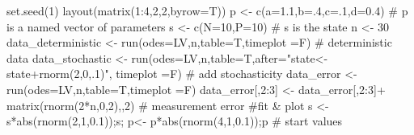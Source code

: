 \documentclass[
  a4paper,
  DIV=11,
  numbers=noendperiod,
  oneside]{scrreprt}
\newenvironment{Shaded}{}{}
\newcommand{\AttributeTok}[1]{\textcolor[rgb]{0.84,0.23,0.29}{#1}}
\newcommand{\CommentTok}[1]{\textcolor[rgb]{0.42,0.45,0.49}{#1}}
\newcommand{\DecValTok}[1]{\textcolor[rgb]{0.00,0.36,0.77}{#1}}
\newcommand{\FloatTok}[1]{\textcolor[rgb]{0.00,0.36,0.77}{#1}}
\newcommand{\FunctionTok}[1]{\textcolor[rgb]{0.44,0.26,0.76}{#1}}
\newcommand{\NormalTok}[1]{\textcolor[rgb]{0.14,0.16,0.18}{#1}}
\newcommand{\OtherTok}[1]{\textcolor[rgb]{0.44,0.26,0.76}{#1}}
\newcommand{\SpecialCharTok}[1]{\textcolor[rgb]{0.00,0.36,0.77}{#1}}
\newcommand{\StringTok}[1]{\textcolor[rgb]{0.01,0.18,0.38}{#1}}
\begin{document}
\begin{Shaded}
\begin{Highlighting}[]
\FunctionTok{set.seed}\NormalTok{(}\DecValTok{1}\NormalTok{)}
\FunctionTok{layout}\NormalTok{(}\FunctionTok{matrix}\NormalTok{(}\DecValTok{1}\SpecialCharTok{:}\DecValTok{4}\NormalTok{,}\DecValTok{2}\NormalTok{,}\DecValTok{2}\NormalTok{,}\AttributeTok{byrow=}\NormalTok{T))}
\NormalTok{p }\OtherTok{\textless{}{-}} \FunctionTok{c}\NormalTok{(}\AttributeTok{a=}\FloatTok{1.1}\NormalTok{,}\AttributeTok{b=}\NormalTok{.}\DecValTok{4}\NormalTok{,}\AttributeTok{c=}\NormalTok{.}\DecValTok{1}\NormalTok{,}\AttributeTok{d=}\FloatTok{0.4}\NormalTok{) }\CommentTok{\# p is a named vector of parameters}
\NormalTok{s }\OtherTok{\textless{}{-}} \FunctionTok{c}\NormalTok{(}\AttributeTok{N=}\DecValTok{10}\NormalTok{,}\AttributeTok{P=}\DecValTok{10}\NormalTok{)             }\CommentTok{\# s is the state}
\NormalTok{n }\OtherTok{\textless{}{-}} \DecValTok{30}
\NormalTok{data\_deterministic }\OtherTok{\textless{}{-}} \FunctionTok{run}\NormalTok{(}\AttributeTok{odes=}\NormalTok{LV,n,}\AttributeTok{table=}\NormalTok{T,}\AttributeTok{timeplot =}\NormalTok{F) }\CommentTok{\# deterministic data}
\NormalTok{data\_stochastic }\OtherTok{\textless{}{-}} \FunctionTok{run}\NormalTok{(}\AttributeTok{odes=}\NormalTok{LV,n,}\AttributeTok{table=}\NormalTok{T,}\AttributeTok{after=}\StringTok{"state\textless{}{-}state+rnorm(2,0,.1)"}\NormalTok{,}
                       \AttributeTok{timeplot =}\NormalTok{F) }\CommentTok{\# add stochasticity}
\NormalTok{data\_error }\OtherTok{\textless{}{-}} \FunctionTok{run}\NormalTok{(}\AttributeTok{odes=}\NormalTok{LV,n,}\AttributeTok{table=}\NormalTok{T,}\AttributeTok{timeplot =}\NormalTok{F)}
\NormalTok{data\_error[,}\DecValTok{2}\SpecialCharTok{:}\DecValTok{3}\NormalTok{] }\OtherTok{\textless{}{-}}\NormalTok{ data\_error[,}\DecValTok{2}\SpecialCharTok{:}\DecValTok{3}\NormalTok{]}\SpecialCharTok{+}
  \FunctionTok{matrix}\NormalTok{(}\FunctionTok{rnorm}\NormalTok{(}\DecValTok{2}\SpecialCharTok{*}\NormalTok{n,}\DecValTok{0}\NormalTok{,}\DecValTok{2}\NormalTok{),,}\DecValTok{2}\NormalTok{) }\CommentTok{\# measurement error }
\CommentTok{\#fit \& plot}
\NormalTok{s }\OtherTok{\textless{}{-}}\NormalTok{ s}\SpecialCharTok{*}\FunctionTok{abs}\NormalTok{(}\FunctionTok{rnorm}\NormalTok{(}\DecValTok{2}\NormalTok{,}\DecValTok{1}\NormalTok{,}\FloatTok{0.1}\NormalTok{));s; p}\OtherTok{\textless{}{-}}\NormalTok{ p}\SpecialCharTok{*}\FunctionTok{abs}\NormalTok{(}\FunctionTok{rnorm}\NormalTok{(}\DecValTok{4}\NormalTok{,}\DecValTok{1}\NormalTok{,}\FloatTok{0.1}\NormalTok{));p    }\CommentTok{\# start values}

\end{Highlighting}
\end{Shaded}
\end{document}
